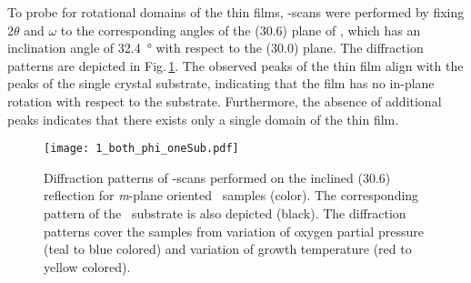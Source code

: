 To probe for rotational domains of the thin films, \textphi-scans were performed by fixing $2\theta$ and $\omega$ to the corresponding angles of the (30.6) plane of \cro, which has an inclination angle of \qty{32.4}{\degree} with respect to the (30.0) plane.
The diffraction patterns are depicted in Fig.\,\ref{Fig:Results_1_phiScan}.
The observed peaks of the thin film align with the peaks of the single crystal substrate, indicating that the film has no in-plane rotation with respect to the substrate.
Furthermore, the absence of additional peaks indicates that there exists only a single domain of the thin film.
\begin{figure}
    \centering
    \texttt{[image: 1\_both\_phi\_oneSub.pdf]}
    \caption{
        Diffraction patterns of \textphi-scans performed on the inclined (30.6) reflection for \textit{m}-plane oriented \cro\ samples (color).
        The corresponding pattern of the \alo\ substrate is also depicted (black).
        The diffraction patterns cover the samples from variation of oxygen partial pressure (teal to blue colored) and variation of growth temperature (red to yellow colored).
    }
    \label{Fig:Results_1_phiScan}
\end{figure}

